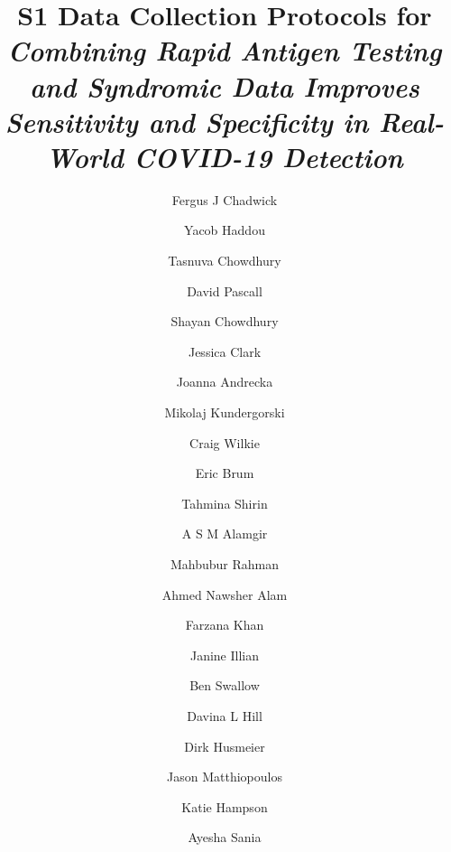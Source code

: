 \documentclass[]{elsarticle} %
\renewenvironment{abstract}{}{}
\begin{document}
\begin{frontmatter}

  \title{\textbf{S1 Data Collection Protocols} for \emph{Combining Rapid Antigen Testing and Syndromic Data Improves Sensitivity and Specificity in Real-World COVID-19 Detection}}
    \author[IBAHCM,UoGLMICS]{Fergus J Chadwick}
    \author[IBAHCM,UoGLMICS]{Yacob Haddou}
    \author[IBAHCM]{Tasnuva Chowdhury}
    \author[MRCB]{David Pascall}
    \author[a2i]{Shayan Chowdhury}
    \author[IBAHCM,UoGLMICS]{Jessica Clark}
    \author[UNFAO]{Joanna Andrecka}
    \author[MathsandStatGla,UoGLMICS]{Mikolaj Kundergorski}
    \author[MathsandStatGla,UoGLMICS]{Craig Wilkie}
    \author[UNFAO]{Eric Brum}
    \author[IEDCR]{Tahmina Shirin}
    \author[IEDCR]{A S M Alamgir}
    \author[IEDCR]{Mahbubur Rahman}
    \author[IEDCR]{Ahmed Nawsher Alam}
    \author[IEDCR]{Farzana Khan}
    \author[MathsandStatGla,UoGLMICS]{Janine Illian}
    \author[MathsandStatGla,UoGLMICS]{Ben Swallow}
    \author[IBAHCM,UoGLMICS]{Davina L Hill}
    \author[MathsandStatGla]{Dirk Husmeier}
    \author[IBAHCM,UoGLMICS]{Jason Matthiopoulos}
    \author[IBAHCM,UoGLMICS]{Katie Hampson}
    \author[Columbia]{Ayesha Sania}
      \address[IBAHCM]{Institute of Biodiversity, Animal Health and Comparative Medicine, University of Glasgow}
    \address[UoGLMICS]{COVID-19 in LMICs Research Group, University of Glasgow}
    \address[MRCB]{MRC Biostatistics Unit, University of Cambridge}
    \address[MathsandStatGla]{School of Mathematics and Statistics, University of Glasgow}
    \address[a2i]{a2i, United Nations Development Program, ICT Ministry, Bangladesh}
    \address[UNFAO]{UN FAO in support of the UN Interagency Support Team, Bangladesh}
    \address[IEDCR]{Institute of Epidemiology, Disease Control and Research, Ministry of Health, Bangladesh}
    \address[Columbia]{Division of Developmental Neuroscience, Department of Psychiatry, Columbia University}
  
  \begin{abstract}
  
  \end{abstract}
  
 \end{frontmatter}
\end{document}
